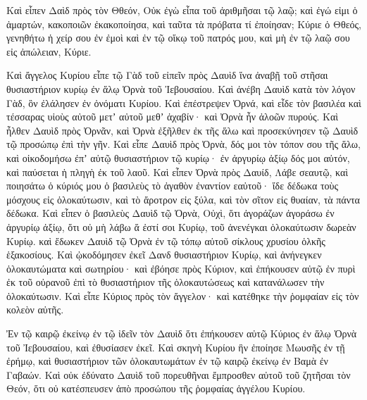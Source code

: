 {Καὶ εἶπεν Δαὶδ πρὸς τὸν Θθεόν, Οὐκ ἐγὼ εἶπα τοῦ ἀριθμῆσαι τῷ λαῷ; καὶ ἐγώ εἰμι ὁ ἁμαρτών, κακοποιῶν ἐκακοποίησα, καὶ ταῦτα τὰ πρόβατα τί ἐποίησαν; Κύριε ὁ Θθεός, γενηθήτω ἡ χείρ σου ἐν ἐμοὶ καὶ ἐν τῷ οἴκῳ τοῦ πατρός μου, καὶ μὴ ἐν τῷ λαῷ σου εἰς ἀπώλειαν, Κύριε.
\par }{\PP {}Καὶ ἄγγελος Κυρίου εἶπε τῷ Γὰδ τοῦ εἰπεῖν πρὸς Δαυὶδ ἵνα ἀναβῇ τοῦ στῆσαι θυσιαστήριον κυρίῳ ἐν ἅλῳ Ὀρνὰ τοῦ Ἰεβουσαίου.
Καὶ ἀνέβη Δαυὶδ κατὰ τὸν λόγον Γὰδ, ὃν ἐλάλησεν ἐν ὀνόματι Κυρίου.
Καὶ ἐπέστρεψεν Ὀρνά, καὶ εἶδε τὸν βασιλέα καὶ τέσσαρας υἱοὺς αὐτοῦ μετʼ αὐτοῦ μεθʼ ἁχαβίν· καὶ Ὀρνὰ ἦν ἀλοῶν πυρούς.
Καὶ ἦλθεν Δαυὶδ πρὸς Ὀρνᾶν, καὶ Ὀρνὰ ἐξῆλθεν ἐκ τῆς ἅλω καὶ προσεκύνησεν τῷ Δαυὶδ τῷ προσώπῳ ἐπὶ τὴν γῆν.
Καὶ εἶπε Δαυὶδ πρὸς Ὀρνὰ, δός μοι τὸν τόπον σου τῆς ἅλω, καὶ οἰκοδομήσω ἐπʼ αὐτῷ θυσιαστήριον τῷ κυρίῳ· ἐν ἀργυρίῳ ἀξίῳ δός μοι αὐτόν, καὶ παύσεται ἡ πληγὴ ἐκ τοῦ λαοῦ.
Καὶ εἶπεν Ὀρνὰ πρὸς Δαυίδ, Λάβε σεαυτῷ, καὶ ποιησάτω ὁ κύριός μου ὁ βασιλεὺς τὸ ἀγαθὸν ἐναντίον εαὐτοῦ· ἴδε δέδωκα τοὺς μόσχους εἰς ὁλοκαύτωσιν, καὶ τὸ ἄροτρον εἰς ξύλα, καὶ τὸν σῖτον εἰς θυαίαν, τὰ πάντα δέδωκα.
Καὶ εἶπεν ὁ βασιλεὺς Δαυὶδ τῷ Ὀρνὰ, Οὐχὶ, ὅτι ἀγοράζων ἀγοράσω ἐν ἀργυρίῳ ἀξίῳ, ὅτι οὐ μὴ λάβω ἅ ἐστί σοι Κυρίῳ, τοῦ ἀνενέγκαι ὁλοκαύτωσιν δωρεὰν Κυρίῳ.
καὶ ἔδωκεν Δαυὶδ τῷ Ὀρνὰ ἐν τῷ τόπῳ αὐτοῦ σίκλους χρυσίου ὁλκῆς ἑξακοσίους.
Καὶ ᾠκοδόμησεν ἐκεῖ Δανδ θυσιαστήριον Κυρίῳ, καὶ ἀνήνεγκεν ὁλοκαυτώματα καὶ σωτηρίου· καὶ ἐβόησε πρὸς Κύριον, καὶ ἐπήκουσεν αὐτῷ ἐν πυρὶ ἐκ τοῦ οὐρανοῦ ἐπὶ τὸ θυσιαστήριον τῆς ὁλοκαυτώσεως καὶ κατανάλωσεν τὴν ὁλοκαύτωσιν.
Καὶ εἶπε Κύριος πρὸς τὸν ἄγγελον· καὶ κατέθηκε τὴν ῥομφαίαν εἰς τὸν κολεὸν αὐτῆς.
\par }{\PP {}Ἐν τῷ καιρῷ ἐκείνῳ ἐν τῷ ἰδεῖν τὸν Δαυὶδ ὅτι ἐπήκουσεν αὐτῷ Κύριος ἐν ἅλῳ Ὀρνὰ τοῦ Ἰεβουσαίου, καὶ ἐθυσίασεν ἐκεῖ.
Καὶ σκηνὴ Κυρίου ἣν ἐποίησε Μωυσῆς ἐν τῇ ἐρήμῳ, καὶ θυσιαστήριον τῶν ὁλοκαυτωμάτων ἐν τῷ καιρῷ ἐκείνῳ ἐν Βαμὰ ἐν Γαβαών.
Καὶ οὐκ ἐδύνατο Δαυὶδ τοῦ πορευθῆναι ἔμπροσθεν αὐτοῦ τοῦ ζητῆσαι τὸν Θεόν, ὅτι οὐ κατέσπευσεν ἀπὸ προσώπου τῆς ῥομφαίας ἀγγέλου Κυρίου.

}
